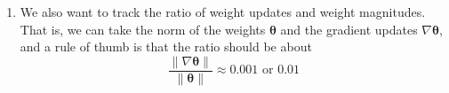 \begin{enumerate}
\begin{figure}[H]
    \caption{If you see loss curves that are flat for a while and then start decreasing, then bad initialization is a prime suspect. } 
    \label{fig:loss_curve_diagnostics}
  \end{figure}

  \item We also want to track the ratio of weight updates and weight magnitudes. That is, we can take the norm of the weights $\boldsymbol{\theta}$ and the gradient updates $\nabla \boldsymbol{\theta}$, and a rule of thumb is that the ratio should be about 
  \begin{equation}
    \frac{\|\nabla \boldsymbol{\theta}\|}{\|\boldsymbol{\theta}\|} \approx 0.001 \text{ or } 0.01
  \end{equation}
\end{enumerate}

